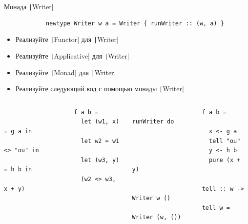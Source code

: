     \begin{frame}[fragile]{Монада \texttt|Writer|}
        \begin{verbatim}
            newtype Writer w a = Writer { runWriter :: (w, a) }
        \end{verbatim}
        \begin{itemize}
            \item[\todo] Реализуйте \texttt|Functor| для \texttt|Writer|
            \item[\todo] Реализуйте \texttt|Applicative| для \texttt|Writer|
            \item[\todo] Реализуйте \texttt|Monad| для \texttt|Writer|
            \item[\todo] Реализуйте следующий код с помощью монады \texttt|Writer|
        \end{itemize}
        \vspace{-1em}
        \begin{columns}[onlytextwidth]
            \begin{column}[t]{0.485\textwidth}
                \begin{verbatim}
                    f a b =
                      let (w1, x) = g a in
                      let w2 = w1 <> "ou" in
                      let (w3, y) = h b in
                      (w2 <> w3, x + y)
                \end{verbatim}
            \end{column}\hfill%
            \begin{column}[t]{0.485\textwidth}
                \pause
                \begin{verbatim}
                    f a b = runWriter do
                      x <- g a
                      tell "ou"
                      y <- h b
                      pure (x + y)

                    tell :: w -> Writer w ()
                    tell w = Writer (w, ())
                \end{verbatim}
            \end{column}
        \end{columns}
    \end{frame}



